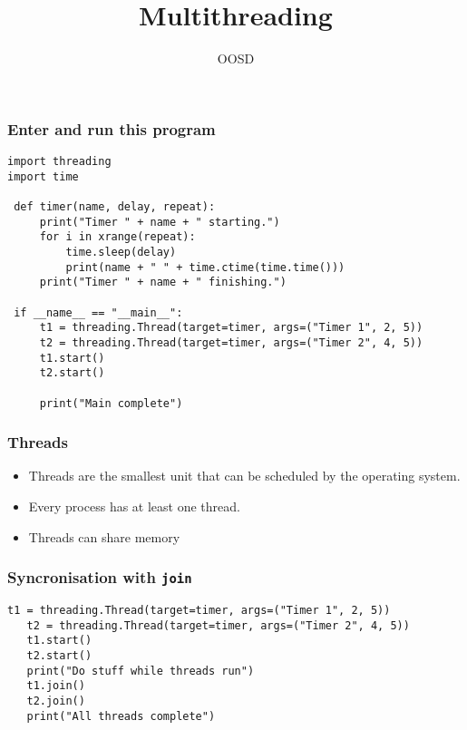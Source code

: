 \documentclass[10pt]{beamer}
\title{Multithreading}
\author[IN710]{OOSD}
\institute[Otago Polytechnic]{
  School of Information Technology \\
  Otago Polytechnic \\
  Dunedin, New Zealand \\
}
\date{}
\begin{document}
\begin{frame}[plain]
  \titlepage
\end{frame}

\begin{frame}[fragile]
  \frametitle{Enter and run this program}
\begin{Verbatim}[commandchars=\\\[\]]
import threading
import time

 def timer(name, delay, repeat):
     print("Timer " + name + " starting.")
     for i in xrange(repeat):
         time.sleep(delay)
         print(name + " " + time.ctime(time.time()))
     print("Timer " + name + " finishing.")

 if __name__ == "__main__":
     t1 = threading.Thread(target=timer, args=("Timer 1", 2, 5))
     t2 = threading.Thread(target=timer, args=("Timer 2", 4, 5))
     t1.start()
     t2.start()
 
     print("Main complete")

\end{Verbatim}

\end{frame}

\begin{frame}
	\frametitle{Threads}

	\begin{itemize}
		\item Threads are the smallest unit that can be
			scheduled by the operating system.
		\item Every process has at least one thread.
		\item Threads can share memory
	\end{itemize}
\end{frame}
\begin{frame}[fragile]
	\frametitle{Syncronisation with \texttt{join}}
\begin{Verbatim}[commandchars=\\\[\]]
   t1 = threading.Thread(target=timer, args=("Timer 1", 2, 5))
   t2 = threading.Thread(target=timer, args=("Timer 2", 4, 5))
   t1.start()
   t2.start()
   print("Do stuff while threads run")
   t1.join()
   t2.join()
   print("All threads complete")

\end{Verbatim}

\end{frame}
\end{document}
